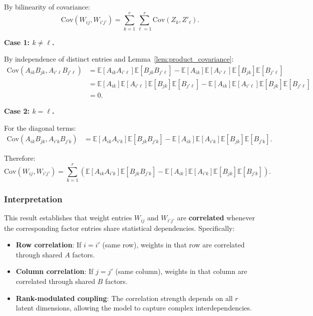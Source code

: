 \documentclass{article}
\theoremstyle{plain}
\theoremstyle{definition}
\theoremstyle{remark}
\begin{document}
By bilinearity of covariance:
\[
\mathrm{Cov}(W_{ij}, W_{i'j'}) = \sum_{k=1}^{r} \sum_{\ell=1}^{r} \mathrm{Cov}(Z_k, Z'_\ell).
\]

\textbf{Case 1: $k \neq \ell$.}

By independence of distinct entries and Lemma~\ref{lem:product_covariance}:
\begin{align*}
\mathrm{Cov}(A_{ik}B_{jk}, A_{i'\ell}B_{j'\ell})
&= \mathbb{E}[A_{ik}A_{i'\ell}]\mathbb{E}[B_{jk}B_{j'\ell}] 
   - \mathbb{E}[A_{ik}]\mathbb{E}[A_{i'\ell}]\mathbb{E}[B_{jk}]\mathbb{E}[B_{j'\ell}] \\
&= \mathbb{E}[A_{ik}]\mathbb{E}[A_{i'\ell}]\mathbb{E}[B_{jk}]\mathbb{E}[B_{j'\ell}]
   - \mathbb{E}[A_{ik}]\mathbb{E}[A_{i'\ell}]\mathbb{E}[B_{jk}]\mathbb{E}[B_{j'\ell}] \\
&= 0.
\end{align*}

\textbf{Case 2: $k = \ell$.}

For the diagonal terms:
\begin{align*}
\mathrm{Cov}(A_{ik}B_{jk}, A_{i'k}B_{j'k})
&= \mathbb{E}[A_{ik}A_{i'k}]\mathbb{E}[B_{jk}B_{j'k}] 
   - \mathbb{E}[A_{ik}]\mathbb{E}[A_{i'k}]\mathbb{E}[B_{jk}]\mathbb{E}[B_{j'k}].
\end{align*}

Therefore:
\[
\mathrm{Cov}(W_{ij}, W_{i'j'}) 
= \sum_{k=1}^{r} \left(\mathbb{E}[A_{ik}A_{i'k}]\mathbb{E}[B_{jk}B_{j'k}] 
- \mathbb{E}[A_{ik}]\mathbb{E}[A_{i'k}]\mathbb{E}[B_{jk}]\mathbb{E}[B_{j'k}]\right).
\]

\subsubsection{Interpretation}

This result establishes that weight entries $W_{ij}$ and $W_{i'j'}$ are \textbf{correlated} whenever the corresponding factor entries share statistical dependencies. Specifically:

\begin{itemize}
    \item \textbf{Row correlation}: If $i = i'$ (same row), weights in that row are correlated through shared $A$ factors.
    
    \item \textbf{Column correlation}: If $j = j'$ (same column), weights in that column are correlated through shared $B$ factors.
    
    \item \textbf{Rank-modulated coupling}: The correlation strength depends on all $r$ latent dimensions, allowing the model to capture complex interdependencies.
\end{itemize}
\end{document}

